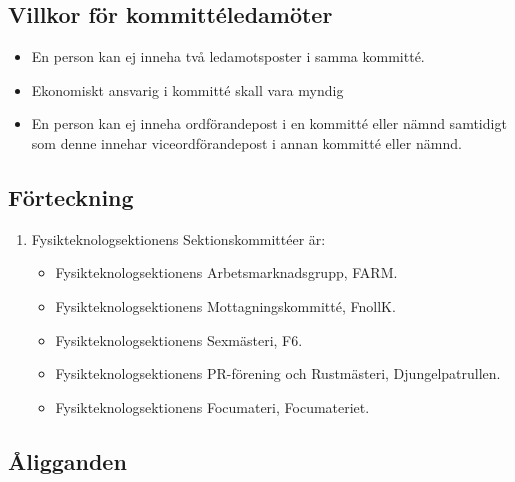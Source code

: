 \documentclass[11pt,a4paper]{article}
\begin{document}
\subsection{Villkor för kommittéledamöter}
\begin{itemize}
\item En person kan ej inneha två ledamotsposter i samma kommitté.
\item Ekonomiskt ansvarig i kommitté skall vara myndig
\item En person kan ej inneha ordförandepost i en kommitté eller nämnd samtidigt som denne innehar viceordförandepost i annan kommitté eller nämnd.

\end{itemize}

\subsection{Förteckning}

\begin{enumerate}[\thesubsection .1]
  \item Fysikteknologsektionens Sektionskommittéer är:
    \begin{itemize}
      \item Fysikteknologsektionens Arbetsmarknadsgrupp, FARM.
      \item Fysikteknologsektionens Mottagningskommitté, FnollK.
      \item Fysikteknologsektionens Sexmästeri, F6.
      \item Fysikteknologsektionens PR-förening och Rustmästeri, Djungelpatrullen.
      \item Fysikteknologsektionens Focumateri, Focumateriet. 
    \end{itemize}
\end{enumerate}

\subsection{Åligganden}
\end{document}
